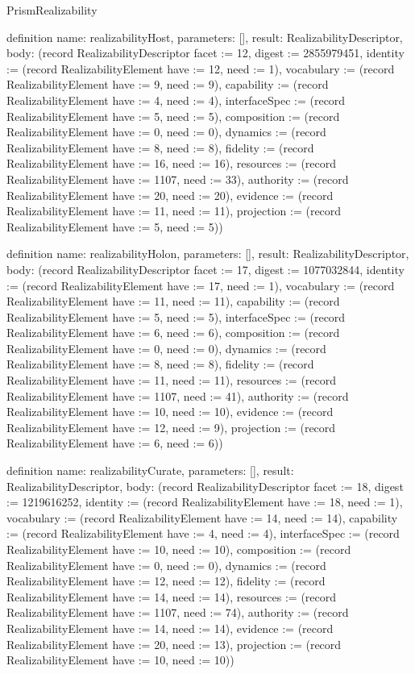 \begin{lexlean}{PrismRealizability}
\begin{semanticmodule}
definition{
  name: realizabilityHost,
  parameters: [],
  result: RealizabilityDescriptor,
  body: (record RealizabilityDescriptor {facet := 12, digest := 2855979451, identity := (record RealizabilityElement {have := 12, need := 1}), vocabulary := (record RealizabilityElement {have := 9, need := 9}), capability := (record RealizabilityElement {have := 4, need := 4}), interfaceSpec := (record RealizabilityElement {have := 5, need := 5}), composition := (record RealizabilityElement {have := 0, need := 0}), dynamics := (record RealizabilityElement {have := 8, need := 8}), fidelity := (record RealizabilityElement {have := 16, need := 16}), resources := (record RealizabilityElement {have := 1107, need := 33}), authority := (record RealizabilityElement {have := 20, need := 20}), evidence := (record RealizabilityElement {have := 11, need := 11}), projection := (record RealizabilityElement {have := 5, need := 5})})
}

definition{
  name: realizabilityHolon,
  parameters: [],
  result: RealizabilityDescriptor,
  body: (record RealizabilityDescriptor {facet := 17, digest := 1077032844, identity := (record RealizabilityElement {have := 17, need := 1}), vocabulary := (record RealizabilityElement {have := 11, need := 11}), capability := (record RealizabilityElement {have := 5, need := 5}), interfaceSpec := (record RealizabilityElement {have := 6, need := 6}), composition := (record RealizabilityElement {have := 0, need := 0}), dynamics := (record RealizabilityElement {have := 8, need := 8}), fidelity := (record RealizabilityElement {have := 11, need := 11}), resources := (record RealizabilityElement {have := 1107, need := 41}), authority := (record RealizabilityElement {have := 10, need := 10}), evidence := (record RealizabilityElement {have := 12, need := 9}), projection := (record RealizabilityElement {have := 6, need := 6})})
}

definition{
  name: realizabilityCurate,
  parameters: [],
  result: RealizabilityDescriptor,
  body: (record RealizabilityDescriptor {facet := 18, digest := 1219616252, identity := (record RealizabilityElement {have := 18, need := 1}), vocabulary := (record RealizabilityElement {have := 14, need := 14}), capability := (record RealizabilityElement {have := 4, need := 4}), interfaceSpec := (record RealizabilityElement {have := 10, need := 10}), composition := (record RealizabilityElement {have := 0, need := 0}), dynamics := (record RealizabilityElement {have := 12, need := 12}), fidelity := (record RealizabilityElement {have := 14, need := 14}), resources := (record RealizabilityElement {have := 1107, need := 74}), authority := (record RealizabilityElement {have := 14, need := 14}), evidence := (record RealizabilityElement {have := 20, need := 13}), projection := (record RealizabilityElement {have := 10, need := 10})})
}


\end{semanticmodule}
\end{lexlean}
